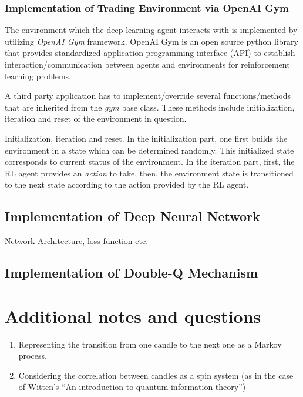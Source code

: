 \documentclass[twocolumn,aps,pra,superscriptaddress,nofootinbib,longbibliography]{revtex4-2}
\begin{document}
\subsubsection{Implementation of Trading Environment via OpenAI Gym}

The environment which the deep learning agent interacts with is implemented by utilizing \textit{OpenAI Gym} framework. OpenAI Gym is an open source python library that provides standardized application programming interface (API) to establish interaction/communication between agents and environments for reinforcement learning problems. 

A third party application has to implement/override several functions/methods that are inherited from the \textit{gym} base class. These methods include initialization, iteration and reset of the environment in question. 

Initialization, iteration and reset. In the initialization part, one first builds the environment in a state which can be determined randomly. This initialized state corresponds to current status of the environment. In the iteration part, first, the RL agent provides an \textit{action} to take, then, the environment state is transitioned to the next state according to the action provided by the RL agent.


\subsection{Implementation of Deep Neural Network}

Network Architecture, loss function etc.

\subsection{Implementation of Double-Q Mechanism}

\section{Additional notes and questions}

\begin{enumerate}
    \item Representing the transition from one candle to the next one as a Markov process.
    \item Considering the correlation between candles as a spin system (as in the case of Witten's ``An introduction to quantum information theory'') 
\end{enumerate}




\clearpage



\end{document}
